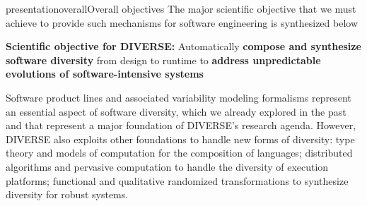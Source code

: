 \documentclass{ra2018}
\newcommand{\team}{DIVERSE}
\begin{document}
\begin{module}{presentation}{overall}{Overall objectives}
  The major scientific objective that we must achieve to provide such mechanisms for software engineering is synthesized below


    \textbf{Scientific objective for \team{}:} Automatically \textbf{compose and synthesize software diversity} from design to runtime to \textbf{address unpredictable evolutions of software-intensive systems} 

  Software product lines and associated variability modeling formalisms represent an essential aspect of software diversity, which we already explored in the past and that represent a major foundation of \team{}'s research agenda. 
  However, \team{}  also exploits other foundations to handle new forms of diversity: type theory and models of computation for the composition of languages; distributed algorithms and pervasive computation to handle the diversity of execution platforms;  functional and qualitative randomized transformations to synthesize diversity for robust systems.






\end{module}



\end{document}
